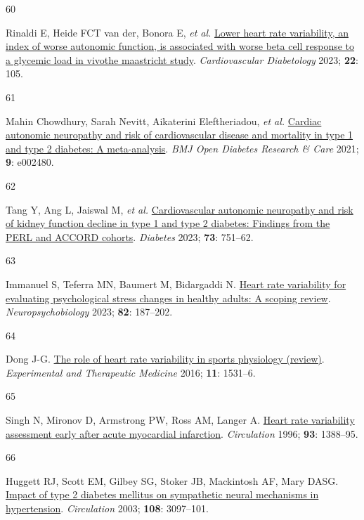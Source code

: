\documentclass[
  letterpaper,
  headsepline=true,
  open=any]{scrbook}
\newlength{\cslhangindent}
\newlength{\csllabelwidth}
\newlength{\cslentryspacingunit} %
\newenvironment{CSLReferences}[2] %
 {%
  \setlength{\parindent}{0pt}
  \ifodd #1
  \let\oldpar\par
  \def\par{\hangindent=\cslhangindent\oldpar}
  \fi
  \setlength{\parskip}{#2\cslentryspacingunit}
 }%
 {}
\newcommand{\CSLLeftMargin}[1]{\parbox[t]{\csllabelwidth}{#1}}
\newcommand{\CSLRightInline}[1]{\parbox[t]{\linewidth - \csllabelwidth}{#1}\break}
\begin{document}
\begin{CSLReferences}{0}{0}
\leavevmode{}%
\CSLLeftMargin{60 }%
\CSLRightInline{Rinaldi E, Heide FCT van der, Bonora E, \emph{et al.}
\href{https://doi.org/10.1186/s12933-023-01837-0}{Lower heart rate
variability, an index of worse autonomic function, is associated with
worse beta cell response to a glycemic load in vivo{\textemdash}the
maastricht study}. \emph{Cardiovascular Diabetology} 2023; \textbf{22}:
105.}

\leavevmode{}%
\CSLLeftMargin{61 }%
\CSLRightInline{Mahin Chowdhury, Sarah Nevitt, Aikaterini Eleftheriadou,
\emph{et al.} \href{https://doi.org/10.1136/bmjdrc-2021-002480}{Cardiac
autonomic neuropathy and risk of cardiovascular disease and mortality in
type 1 and type 2 diabetes: A meta-analysis}. \emph{BMJ Open Diabetes
Research \& Care} 2021; \textbf{9}: e002480.}

\leavevmode{}%
\CSLLeftMargin{62 }%
\CSLRightInline{Tang Y, Ang L, Jaiswal M, \emph{et al.}
\href{https://doi.org/10.2337/db23-0247}{Cardiovascular autonomic
neuropathy and risk of kidney function decline in type 1 and type 2
diabetes: Findings from the PERL and ACCORD cohorts}. \emph{Diabetes}
2023; \textbf{73}: 751--62.}

\leavevmode{}%
\CSLLeftMargin{63 }%
\CSLRightInline{Immanuel S, Teferra MN, Baumert M, Bidargaddi N.
\href{https://doi.org/10.1159/000530376}{Heart rate variability for
evaluating psychological stress changes in healthy adults: A scoping
review}. \emph{Neuropsychobiology} 2023; \textbf{82}: 187--202.}

\leavevmode{}%
\CSLLeftMargin{64 }%
\CSLRightInline{Dong J-G.
\href{https://doi.org/10.3892/etm.2016.3104}{The role of heart rate
variability in sports physiology (review)}. \emph{Experimental and
Therapeutic Medicine} 2016; \textbf{11}: 1531--6.}

\leavevmode{}%
\CSLLeftMargin{65 }%
\CSLRightInline{Singh N, Mironov D, Armstrong PW, Ross AM, Langer A.
\href{https://doi.org/10.1161/01.CIR.93.7.1388}{Heart rate variability
assessment early after acute myocardial infarction}. \emph{Circulation}
1996; \textbf{93}: 1388--95.}

\leavevmode{}%
\CSLLeftMargin{66 }%
\CSLRightInline{Huggett RJ, Scott EM, Gilbey SG, Stoker JB, Mackintosh
AF, Mary DASG.
\href{https://doi.org/10.1161/01.CIR.0000103123.66264.FE}{Impact of type
2 diabetes mellitus on sympathetic neural mechanisms in hypertension}.
\emph{Circulation} 2003; \textbf{108}: 3097--101.}


\end{CSLReferences}
\end{document}
